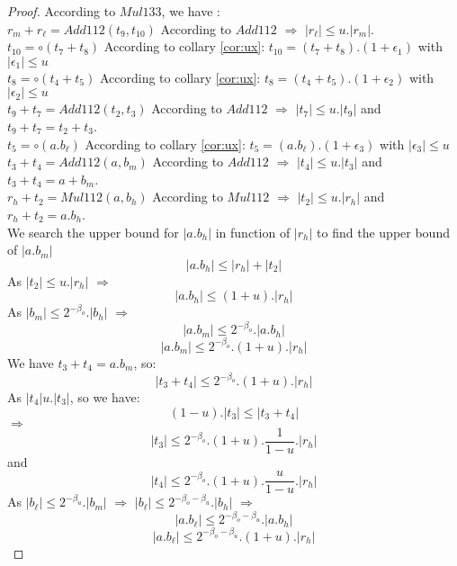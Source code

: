 \begin{proof} \color{-yellow}
According to $Mul133$, we have :\\
$r_m + r_{\ell} = Add112(t_9,t_{10})$ According to $Add112$ $\Rightarrow$  $\lvert r_{\ell} \rvert \le u. \lvert r_m \rvert$.\\
$t_{10} = \circ(t_7 + t_8)$ According to collary \ref{cor:ux}: $t_{10} = (t_7 + t_8).(1+\epsilon_1)$ with $\lvert \epsilon_1 \rvert \le u$\\
$t_8 = \circ(t_4 + t_5)$ According to collary \ref{cor:ux}:  $t_8 = (t_4 + t_5).(1+\epsilon_2)$ with $\lvert \epsilon_2 \rvert \le u$\\
$t_9 + t_7 = Add112(t_2,t_3)$ According to $Add112$ $\Rightarrow$  $\lvert t_7 \rvert \le u. \lvert t_9 \rvert$ and $t_9 + t_7 = t_2 + t_3$.\\
$t_5 = \circ(a.b_{\ell})$ According to collary \ref{cor:ux}: $t_5 = (a.b_{\ell}).(1+\epsilon_3)$ with $\lvert \epsilon_3 \rvert \le u$\\
$t_3 + t_4 = Add112(a,b_m)$ According to $Add112$ $\Rightarrow$  $\lvert t_4 \rvert \le u. \lvert t_3 \rvert$ and $t_3 + t_4 = a + b_m$.\\
$r_h + t_2 = Mul112(a,b_h)$ According to $Mul112$ $\Rightarrow$  $\lvert t_2 \rvert \le u. \lvert r_h \rvert$ and $r_h + t_2 = a . b_h$.\\
We search the upper bound for $\lvert a.b_h \rvert$ in function of $\lvert r_h \rvert$ to find the upper bound of $\lvert a.b_m \rvert$
$$\lvert a.b_h \rvert \le \lvert r_h \rvert + \lvert t_2 \rvert$$
As $\lvert t_2 \rvert \le u. \lvert r_h \rvert$ $\Rightarrow$
$$\lvert a.b_h \rvert \le (1+u).\lvert r_h \rvert $$
As $\lvert b_m \rvert \le 2^{-\beta_o}.\lvert b_h \rvert$ $\Rightarrow$
$$\lvert a.b_m \rvert \le 2^{-\beta_o}.\lvert a.b_h \rvert$$
$$\lvert a.b_m \rvert \le 2^{-\beta_o}.(1+u).\lvert r_h \rvert$$
We have $t_3 + t_4 = a.b_m$, so:
$$\lvert t_3 + t_4 \rvert \le  2^{-\beta_o}.(1+u).\lvert r_h \rvert$$
As $\lvert t_4 \rvert u. \lvert t_3 \rvert $, so we have:
$$(1-u). \lvert t_3 \rvert \le \lvert t_3 + t_4 \rvert$$
$\Rightarrow$
$$\lvert t_3 \rvert \le 2^{-\beta_o}.(1+u).\frac{1}{1-u}.\lvert r_h \rvert$$
and 
$$\lvert t_4 \rvert \le 2^{-\beta_o}.(1+u).\frac{u}{1-u}.\lvert r_h \rvert$$
As $\lvert b_{\ell} \rvert \le 2^{-\beta_u}.\lvert b_m \rvert$ $\Rightarrow$
$\lvert b_{\ell} \rvert \le 2^{-\beta_o -\beta_u}.\lvert b_h \rvert$ $\Rightarrow$
$$ \lvert a.b_{\ell} \rvert \le 2^{-\beta_o -\beta_u}.\lvert a.b_h \rvert$$
$$ \lvert a.b_{\ell} \rvert \le 2^{-\beta_o -\beta_u}.(1+u).\lvert r_h \rvert$$

\end{proof}
